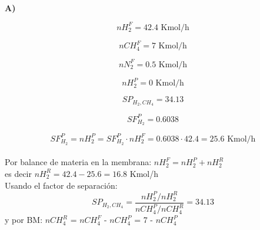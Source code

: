 \documentclass{report}
\begin{document}
\sol \\

\noindent \textbf{A)}\\

\begin{multicols}{2}
	\noindent
	\begin{equation*}
		nH_2^F = 42.4 \text{ Kmol/h}
	\end{equation*}
	
	\begin{equation*}
		nCH_4^F = 7 \text{ Kmol/h}
	\end{equation*}
	
	\begin{equation*}
		nN_2^F = 0.5 \text{ Kmol/h}
	\end{equation*}
	
	\columnbreak
	
	\begin{equation*}
		nH_2^P = 0 \text{ Kmol/h}
	\end{equation*}
	
	\begin{equation*}
		SP_{H_2,CH_4} = 34.13
	\end{equation*}
	
	\begin{equation*}
		SF_{H_2}^P = 0.6038
	\end{equation*}
	\end{multicols}

\begin{equation*}
    SF_{H_2}^P = nH_2^P = SF_{H_2}^P \cdot nH_2^F = 0.6038 \cdot 42.4 = 25.6 \text{ Kmol/h}
\end{equation*}\\

\noindent Por balance de materia en la membrana: $nH_2^F = nH_2^P + nH_2^R$\\

\noindent es decir $nH_2^R = 42.4 - 25.6 = 16.8$ Kmol/h\\

\noindent  Usando el factor de separación:
\begin{equation*}
	SP_{H_2,CH_4} = \frac{nH_2^P/nH_2^R}{nCH_4^P/nCH_4^R} = 34.13
\end{equation*}
y por BM: $nCH_4^R$ = $nCH_4^F$ - $nCH_4^P$ = 7 - $nCH_4^P$\\
\end{document}
